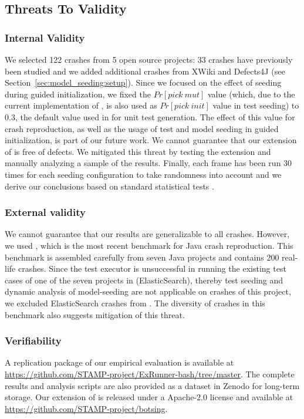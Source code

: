
\subsection{Threats To Validity}\label{sec:model_seeding:ttvalidity}

\subsubsection{Internal Validity}
We selected 122 crashes from 5 open source projects: 33 crashes have previously been studied \cite{Soltani2018b} and we added additional crashes from XWiki and Defects4J (see Section~\ref{sec:model_seeding:setup}). 
%
Since we focused on the effect of seeding during guided initialization, we fixed the $Pr[pick\ mut]$ value (which, due to the current implementation of \botsing, is also used as $Pr[pick\ init]$ value in test seeding) to 0.3, the default value used in \evosuite for unit test generation. The effect of this value for crash reproduction, as well as the usage of test and model seeding in guided initialization, is part of our future work.
%
We cannot guarantee that our extension of \botsing is free of defects. We mitigated this threat by testing the extension and manually analyzing a sample of the results.
%
Finally, each frame has been run 30 times for each seeding configuration to take randomness into account and we derive our conclusions based on standard statistical tests \cite{Arcuri2014,Panichella2017c}.

\subsubsection{External validity}
We cannot guarantee that our results are generalizable to all crashes. However, we used \jcrashpack, which is the most recent benchmark for Java crash reproduction. This benchmark is assembled carefully from seven Java projects and contains 200 real-life crashes. Since the \evosuite test executor is unsuccessful in running the existing test cases of one of the seven projects in \jcrashpack (ElasticSearch), thereby test seeding and dynamic analysis of model-seeding are not applicable on crashes of this project, we excluded ElasticSearch crashes from \jcrashpack. The diversity of crashes in this benchmark also suggests mitigation of this threat.

\subsubsection{Verifiability} 
A replication package of our empirical evaluation is available at \url{https://github.com/STAMP-project/ExRunner-bash/tree/master}. The complete results and analysis scripts are also provided as a dataset in Zenodo \cite{pouria_derakhshanfar_2019_3673916} for long-term storage. Our extension of \botsing is released under a Apache-2.0 license and available at \url{https://github.com/STAMP-project/botsing}.




